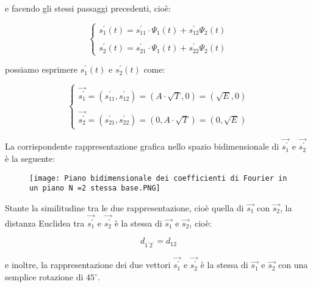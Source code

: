 e facendo gli stessi passaggi precedenti, cioè: 

{
    \Large 
    \begin{equation}
        \begin{cases}
            s_1^{'} (t) = s_{11}^{'} \cdot \Psi_1(t) + s_{12}^{'} \Psi_2 (t)
            \\
            \quad
            \\
            s_2^{'} (t) = s_{21}^{'} \cdot \Psi_1(t) + s_{22}^{'} \Psi_2 (t)
        \end{cases}
    \end{equation}
}

possiamo esprimere $s_1^{'} (t)$ e $s_2^{'} (t)$ come: 

{
    \Large 
    \begin{equation}
        \begin{cases}
            \overrightarrow{s_1^{'}} = (s_{11}^{'}, s_{12}^{'} ) = \left(A \cdot \sqrt{T}, 0 \right) = \left( \sqrt{E}, 0\right)
            \\
            \quad
            \\
            \overrightarrow{s_2^{'}} = (s_{21}^{'}, s_{22}^{'} ) = \left(0 , A \cdot \sqrt{T}\right) = \left( 0 , \sqrt{E}\right)
        \end{cases}
    \end{equation}
}

La corrispondente rappresentazione grafica nello spazio bidimensionale di $\overrightarrow{s_1^{'}}$ e $\overrightarrow{s_2^{'}}$ è la seguente: 

\begin{figure}[h]
    \centering
    \texttt{[image: Piano bidimensionale dei coefficienti di Fourier in un piano N =2 stessa base.PNG]}
\end{figure}

Stante la similitudine tra le due rappresentazione, cioè quella di $\overrightarrow{s_1}$ con $\overrightarrow{s_2}$, 
la distanza Euclidea tra $\overrightarrow{s_1^{'}}$ e $\overrightarrow{s_2^{'}}$ è la stessa di $\overrightarrow{s_1}$ e $\overrightarrow{s_2}$, cioè: 

{
    \Large 
    \begin{equation}
        d_{1^{'}2^{'}} = d_{12}
    \end{equation}
}

e inoltre, la rappresentazione dei due vettori $\overrightarrow{s_1^{'}}$ e $\overrightarrow{s_2^{'}}$ 
è la stessa di $\overrightarrow{s_1}$ e $\overrightarrow{s_2}$ con una semplice rotazione di $45^{\circ}$. \newline 

